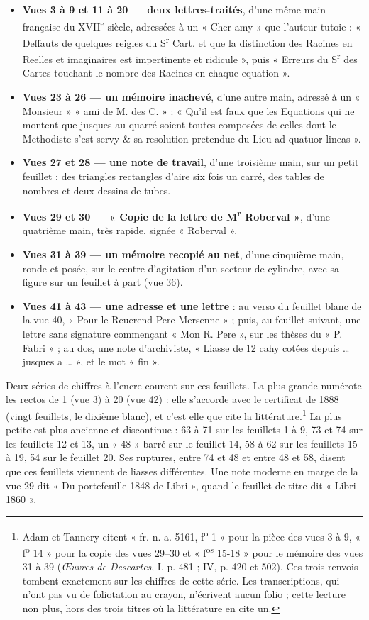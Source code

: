 \documentclass[11pt,a4paper]{article}
\begin{document}
\begin{itemize}
  \item \textbf{Vues 3 à 9 et 11 à 20 — deux lettres-traités}, d'une même main
    française du XVII\textsuperscript{e} siècle, adressées à un « Cher amy »
    que l'auteur tutoie : « Deffauts de quelques reigles du S\textsuperscript{r}
    Cart. et que la distinction des Racines en Reelles et imaginaires est
    impertinente et ridicule », puis « Erreurs du S\textsuperscript{r} des
    Cartes touchant le nombre des Racines en chaque equation ».
  \item \textbf{Vues 23 à 26 — un mémoire inachevé}, d'une autre main, adressé
    à un « Monsieur » « ami de M. des C. » : « Qu'il est faux que les Equations
    qui ne montent que jusques au quarré soient toutes composées de celles dont
    le Methodiste s'est servy \& sa resolution pretendue du Lieu ad quatuor
    lineas ».
  \item \textbf{Vues 27 et 28 — une note de travail}, d'une troisième main, sur
    un petit feuillet : des triangles rectangles d'aire six fois un carré,
    des tables de nombres et deux dessins de tubes.
  \item \textbf{Vues 29 et 30 — « Copie de la lettre de M\textsuperscript{r}
    Roberval »}, d'une quatrième main, très rapide, signée « Roberval ».
  \item \textbf{Vues 31 à 39 — un mémoire recopié au net}, d'une cinquième
    main, ronde et posée, sur le centre d'agitation d'un secteur de cylindre,
    avec sa figure sur un feuillet à part (vue 36).
  \item \textbf{Vues 41 à 43 — une adresse et une lettre} : au verso du
    feuillet blanc de la vue 40, « Pour le Reuerend Pere Mersenne » ; puis,
    au feuillet suivant, une lettre sans signature commençant « Mon R. Pere »,
    sur les thèses du « P. Fabri » ; au dos, une note d'archiviste, « Liasse de
    12 cahy cotées depuis … jusques a … », et le mot « fin ».
\end{itemize}

Deux séries de chiffres à l'encre courent sur ces feuillets. La plus grande
numérote les rectos de 1 (vue 3) à 20 (vue 42) : elle s'accorde avec le
certificat de 1888 (vingt feuillets, le dixième blanc), et c'est elle que cite la
littérature.\footnote{Adam et Tannery citent « fr. n. a. 5161, f\textsuperscript{o} 1 »
pour la pièce des vues 3 à 9, « f\textsuperscript{o} 14 » pour la copie des vues
29–30 et « f\textsuperscript{os} 15-18 » pour le mémoire des vues 31 à 39
(\emph{Œuvres de Descartes}, I, p. 481 ; IV, p. 420 et 502). Ces trois renvois
tombent exactement sur les chiffres de cette série. Les transcriptions,
qui n'ont pas vu de foliotation au crayon, n'écrivent aucun folio ; cette
lecture non plus, hors des trois titres où la littérature en cite un.} La plus
petite est plus ancienne et discontinue : 63 à 71 sur les feuillets 1 à 9, 73 et
74 sur les feuillets 12 et 13, un « 48 » barré sur le feuillet 14, 58 à 62 sur
les feuillets 15 à 19, 54 sur le feuillet 20. Ses ruptures, entre 74 et 48 et
entre 48 et 58, disent que ces feuillets viennent de liasses différentes. Une
note moderne en marge de la vue 29 dit « Du portefeuille 1848 de Libri », quand
le feuillet de titre dit « Libri 1860 ».
\end{document}
